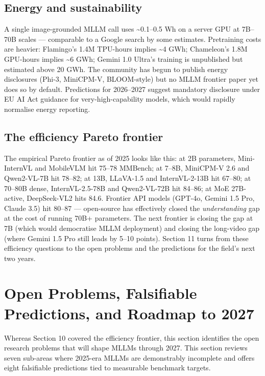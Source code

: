 \documentclass{article}
\begin{document}
\subsection{Energy and sustainability}\label{energy-and-sustainability}

A single image-grounded MLLM call uses \textasciitilde0.1--0.5 Wh on a server GPU at 7B--70B scales --- comparable to a Google search by some estimates. Pretraining costs are heavier: Flamingo's 1.4M TPU-hours implies \textasciitilde4 GWh; Chameleon's 1.8M GPU-hours implies \textasciitilde6 GWh; Gemini 1.0 Ultra's training is unpublished but estimated above 20 GWh. The community has begun to publish energy disclosures (Phi-3, MiniCPM-V, BLOOM-style) but no MLLM frontier paper yet does so by default. Predictions for 2026--2027 suggest mandatory disclosure under EU AI Act guidance for very-high-capability models, which would rapidly normalise energy reporting.

\subsection{The efficiency Pareto frontier}\label{the-efficiency-pareto-frontier}

The empirical Pareto frontier as of 2025 looks like this: at 2B parameters, Mini-InternVL and MobileVLM hit 75--78 MMBench; at 7--8B, MiniCPM-V 2.6 and Qwen2-VL-7B hit 78--82; at 13B, LLaVA-1.5 and InternVL-2-13B hit 67--80; at 70--80B dense, InternVL-2.5-78B and Qwen2-VL-72B hit 84--86; at MoE 27B-active, DeepSeek-VL2 hits 84.6. Frontier API models (GPT-4o, Gemini 1.5 Pro, Claude 3.5) hit 80--87 --- open-source has effectively closed the \emph{understanding} gap at the cost of running 70B+ parameters. The next frontier is closing the gap at 7B (which would democratise MLLM deployment) and closing the long-video gap (where Gemini 1.5 Pro still leads by 5--10 points). Section 11 turns from these efficiency questions to the open problems and the predictions for the field's next two years.

\section{Open Problems, Falsifiable Predictions, and Roadmap to 2027}\label{open-problems-falsifiable-predictions-and-roadmap-to-2027}

Whereas Section 10 covered the efficiency frontier, this section identifies the open research problems that will shape MLLMs through 2027. This section reviews seven sub-areas where 2025-era MLLMs are demonstrably incomplete and offers eight falsifiable predictions tied to measurable benchmark targets.
\end{document}
